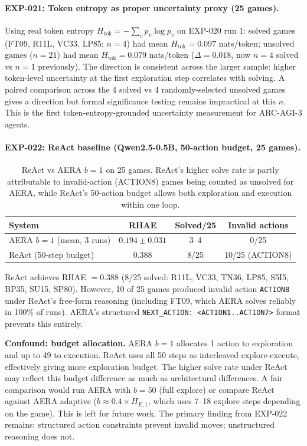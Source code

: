 \documentclass[11pt]{article}
\begin{document}
\paragraph{EXP-021: Token entropy as proper uncertainty proxy (25 games).} Using real token entropy $H_{\text{tok}} = -\sum_v p_v \log p_v$ on EXP-020 run 1: solved games (FT09, R11L, VC33, LP85; $n{=}4$) had mean $H_{\text{tok}} = 0.097$ nats/token; unsolved games ($n{=}21$) had mean $H_{\text{tok}} = 0.079$ nats/token ($\Delta = 0.018$, now $n{=}4$ solved vs $n{=}1$ previously). The direction is consistent across the larger sample: higher token-level uncertainty at the first exploration step correlates with solving. A paired comparison across the 4 solved vs 4 randomly-selected unsolved games gives a direction but formal significance testing remains impractical at this $n$. This is the first token-entropy-grounded uncertainty measurement for ARC-AGI-3 agents.

\paragraph{EXP-022: ReAct baseline (Qwen2.5-0.5B, 50-action budget, 25 games).}

\begin{table}[h]
\centering
\caption{ReAct vs AERA $b{=}1$ on 25 games. ReAct's higher solve rate is partly attributable to invalid-action (ACTION8) games being counted as unsolved for AERA, while ReAct's 50-action budget allows both exploration and execution within one loop.}
\label{tab:react}
\begin{tabular}{lccc}
\toprule
System & RHAE & Solved/25 & Invalid actions \\
\midrule
AERA $b{=}1$ (mean, 3 runs) & $0.194 \pm 0.031$ & 3--4 & 0/25 \\
ReAct (50-step budget) & 0.388 & 8/25 & 10/25 (ACTION8) \\
\bottomrule
\end{tabular}
\end{table}

ReAct achieves RHAE $= 0.388$ (8/25 solved: R11L, VC33, TN36, LP85, S5I5, BP35, SU15, SP80). However, 10 of 25 games produced invalid action \texttt{ACTION8} under ReAct's free-form reasoning (including FT09, which AERA solves reliably in 100\% of runs). AERA's structured \texttt{NEXT\_ACTION: <ACTION1..ACTION7>} format prevents this entirely.

\textbf{Confound: budget allocation.} AERA $b{=}1$ allocates 1 action to exploration and up to 49 to execution. ReAct uses all 50 steps as interleaved explore-execute, effectively giving more exploration budget. The higher solve rate under ReAct may reflect this budget difference as much as architectural differences. A fair comparison would run AERA with $b{=}50$ (full explore) or compare ReAct against AERA adaptive ($b \approx 0.4 \times H_{E,1}$, which uses 7--18 explore steps depending on the game). This is left for future work. The primary finding from EXP-022 remains: structured action constraints prevent invalid moves; unstructured reasoning does not.
\end{document}
